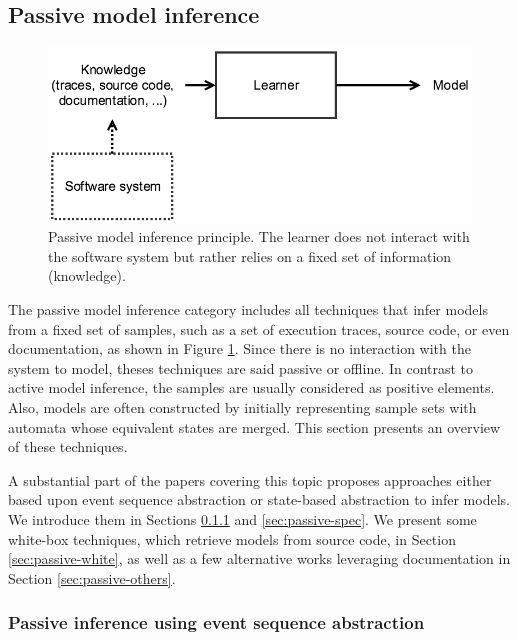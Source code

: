 
\subsection{Passive model inference}
\label{sec:passive}

\begin{figure}[ht]
    \begin{center}
        \includegraphics[width=0.9\linewidth]{figures/passive.png}
    \end{center}

    \caption{Passive model inference principle. The learner does
    not interact with the software system but rather relies on
    a fixed set of information (knowledge).}
    \label{fig:passive}
\end{figure}

The passive model inference category includes all techniques that
infer models from a fixed set of samples, such as a set of
execution traces, source code, or even documentation, as shown in
Figure \ref{fig:passive}. Since there is no interaction with the
system to model, theses techniques are said passive or offline.
In contrast to active model inference, the samples are usually
considered as positive elements. Also, models are often
constructed by initially representing sample sets with automata
whose equivalent states are merged. This section presents an
overview of these techniques.

A substantial part of the papers covering this topic proposes
approaches either based upon event sequence abstraction or
state-based abstraction to infer models. We introduce them in
Sections \ref{sec:passive-fsa} and \ref{sec:passive-spec}.
We present some white-box techniques, which retrieve
models from source code, in Section \ref{sec:passive-white}, as
well as a few alternative works leveraging documentation in
Section \ref{sec:passive-others}.

\subsubsection{Passive inference using event sequence abstraction}
\label{sec:passive-fsa}

